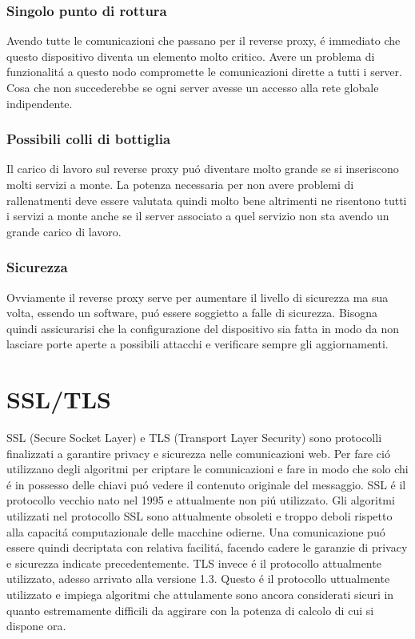 \subsubsection{Singolo punto di rottura}
Avendo tutte le comunicazioni che passano per il reverse proxy, é immediato che questo dispositivo diventa un elemento molto critico. Avere un problema di funzionalitá a questo nodo compromette le comunicazioni dirette a tutti i server. Cosa che non succederebbe se ogni server avesse un accesso alla rete globale indipendente.
\subsubsection{Possibili colli di bottiglia}
Il carico di lavoro sul reverse proxy puó diventare molto grande se si inseriscono molti servizi a monte. La potenza necessaria per non avere problemi di rallenatmenti deve essere valutata quindi molto bene altrimenti ne risentono tutti i servizi a monte anche se il server associato a quel servizio non sta avendo un grande carico di lavoro.
\subsubsection{Sicurezza}
Ovviamente il reverse proxy serve per aumentare il livello di sicurezza ma sua volta, essendo un software, puó essere soggietto a falle di sicurezza. Bisogna quindi assicurarisi che la configurazione del dispositivo sia fatta in modo da non lasciare porte aperte a possibili attacchi e verificare sempre gli aggiornamenti.



\section{SSL/TLS}
\cite{tls}SSL (Secure Socket Layer) e TLS (Transport Layer Security) sono protocolli finalizzati a garantire privacy e sicurezza nelle comunicazioni web. Per fare ció utilizzano degli algoritmi per criptare le comunicazioni e fare in modo che solo chi é in possesso delle chiavi puó vedere il contenuto originale del messaggio. SSL é il protocollo vecchio nato nel 1995 e attualmente non piú utilizzato. Gli algoritmi utilizzati nel protocollo SSL sono attualmente obsoleti e troppo deboli rispetto alla capacitá computazionale delle macchine odierne. Una comunicazione puó essere quindi decriptata con relativa facilitá, facendo cadere le garanzie di privacy e sicurezza indicate precedentemente. TLS invece é il protocollo attualmente utilizzato, adesso arrivato alla versione 1.3. Questo é il protocollo uttualmente utilizzato e impiega algoritmi che attulamente sono ancora considerati sicuri in quanto estremamente difficili da aggirare con la potenza di calcolo di cui si dispone ora.
